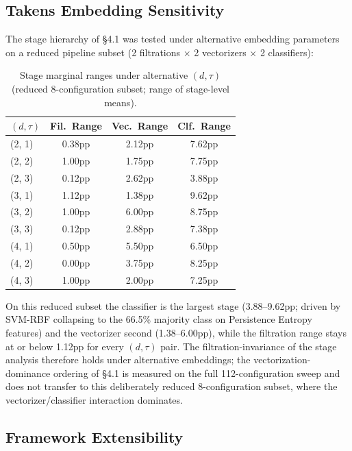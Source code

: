 \documentclass[12pt, a4paper]{report}
\theoremstyle{definition}
\theoremstyle{plain}
\theoremstyle{remark}
\begin{document}
\subsection*{Takens Embedding Sensitivity}

The stage hierarchy of \S4.1 was tested under alternative embedding
parameters on a reduced pipeline subset (2 filtrations $\times$ 2
vectorizers $\times$ 2 classifiers):

\begin{table}[H]
  \centering
  \caption{Stage marginal ranges under alternative $(d, \tau)$
  (reduced 8-configuration subset; range of stage-level means).}
  \label{tab:takens_sweep}
  \begin{tabular}{lccc}
    \toprule
    $(d, \tau)$ & Fil.\ Range & Vec.\ Range & Clf.\ Range \\
    \midrule
    (2, 1) & 0.38pp & 2.12pp & 7.62pp \\
    (2, 2) & 1.00pp & 1.75pp & 7.75pp \\
    (2, 3) & 0.12pp & 2.62pp & 3.88pp \\
    (3, 1) & 1.12pp & 1.38pp & 9.62pp \\
    (3, 2) & 1.00pp & 6.00pp & 8.75pp \\
    (3, 3) & 0.12pp & 2.88pp & 7.38pp \\
    (4, 1) & 0.50pp & 5.50pp & 6.50pp \\
    (4, 2) & 0.00pp & 3.75pp & 8.25pp \\
    (4, 3) & 1.00pp & 2.00pp & 7.25pp \\
    \bottomrule
  \end{tabular}
\end{table}

On this reduced subset the classifier is the largest stage
(3.88--9.62pp; driven by SVM-RBF collapsing to the 66.5\% majority
class on Persistence Entropy features) and the vectorizer second
(1.38--6.00pp), while the filtration range stays at or below 1.12pp
for every $(d, \tau)$ pair. The filtration-invariance of the stage
analysis therefore holds under alternative embeddings; the
vectorization-dominance ordering of \S4.1 is measured on the full
112-configuration sweep and does not transfer to this deliberately
reduced 8-configuration subset, where the vectorizer/classifier
interaction dominates.

\subsection*{Framework Extensibility}
\end{document}
